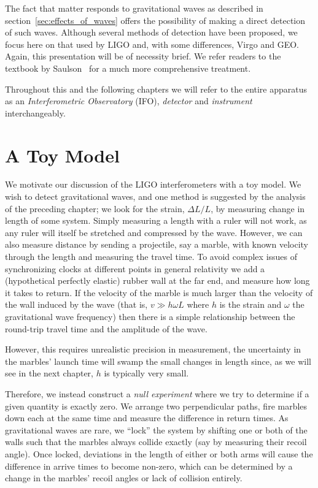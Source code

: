 The fact that matter responds to gravitational waves as described
in section~\ref{sec:effects_of_waves} offers the possibility of making
a direct detection of such waves.  Although several methods of
detection have been proposed, we focus here on that used by LIGO and,
with some differences, Virgo and GEO.  Again, this presentation will
be of necessity brief.  We refer readers to the textbook by
Saulson~\cite{Saulson:1994} for a much more comprehensive
treatment.

Throughout this and the following chapters we will refer to 
the entire apparatus as an \emph{Interferometric Observatory}
(IFO), \emph{detector} and \emph{instrument} interchangeably.

\section{A Toy Model}

We motivate our discussion of the LIGO interferometers with a toy
model.  We wish to detect gravitational waves, and one method is
suggested by the analysis of the preceding chapter; we look for the
strain, $\Delta L/L$, by measuring change in length of some system.
Simply measuring a length with a ruler will not work, as any ruler
will itself be stretched and compressed by the wave.  However, we can
also measure distance by sending a projectile, say a marble, with
known velocity through the length and measuring the travel time.  To
avoid complex issues of synchronizing clocks at different points in
general relativity we add a (hypothetical perfectly elastic) rubber
wall at the far end, and measure how long it takes to return.  If the
velocity of the marble is much larger than the velocity of the wall
induced by the wave (that is, $v \gg h \omega L$ where $h$ is the
strain and $\omega$ the gravitational wave frequency) then there is a
simple relationship between the round-trip travel time and the
amplitude of the wave.

However, this requires unrealistic precision in measurement, the
uncertainty in the marbles' launch time will swamp the small changes in 
length since, as we will see in the next chapter, $h$ is typically
very small.

Therefore, we instead construct a \emph{null experiment} where we try
to determine if a given quantity is exactly zero.  We arrange two
perpendicular paths, fire marbles down each at the same time and
measure the difference in return times.  As gravitational waves are
rare, we ``lock'' the system by shifting one or both of the walls such
that the marbles always collide exactly (say by measuring their recoil
angle).  Once locked, deviations in the length of either or both arms
will cause the difference in arrive times to become non-zero, which
can be determined by a change in the marbles' recoil angles or lack of
collision entirely.


